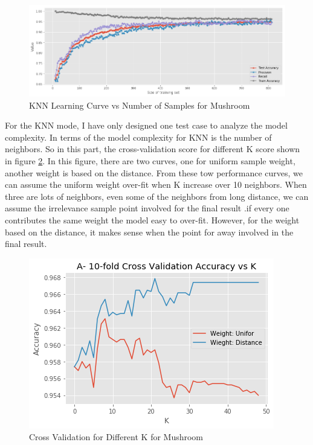 \documentclass[10pt, conference, compsocconf]{IEEEtran}
\begin{document}
\begin{figure}[h]
	\centering
	\includegraphics[scale = 0.25]{image/mushroom_knn_learning.png}
	\caption{KNN Learning Curve vs Number of Samples for Mushroom}
	\label{fig:mushroom_knn_learning}
\end{figure}

For the KNN mode, I have only designed one test case to analyze the model complexity. In terms of the model complexity for KNN is the number of neighbors. So in this part, the cross-validation score for different K score shown in figure \ref{fig:mushroom_knn_K}. In this figure, there are two curves, one for uniform sample weight, another weight is based on the distance. From these tow performance curves, we can assume the uniform weight over-fit when K increase over 10 neighbors. When three are lots of neighbors, even some of the neighbors from long distance, we can assume the irrelevance sample point involved for the final result .if every one contributes the same weight the model easy to over-fit. However, for the weight based on the distance, it makes sense when the point for away involved in the final result. 

\begin{figure}[h]
	\centering
	\includegraphics[scale = 0.5]{image/mushroom_knn_K.png}
	\caption{Cross Validation for Different K for Mushroom}
	\label{fig:mushroom_knn_K}
\end{figure}
\end{document}
